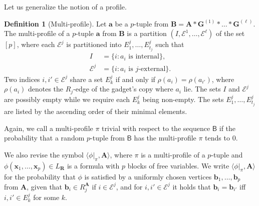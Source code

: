 \documentclass[11pt]{article}
\theoremstyle{plain}
\theoremstyle{definition}
\newtheorem{definition}{Definition}
\theoremstyle{remark}
\newcommand{\stonepar}[2]{\langle #1, #2 \rangle}
\newcommand{\str}[1]{\mathbf{#1}}
\newcommand{\strseq}[1]{{\boldsymbol{\mathsf{#1}}}}
\newcommand{\tpl}[1]{{\bm{#1}}}
\begin{document}
Let us generalize the notion of a profile.

\begin{definition}[Multi-profile]
    Let $\tpl{a}$ be a $p$-tuple from $\str{B} = \str{A}*\str{G}^{(1)}* \dots * \str{G}^{(\ell)}$.
    The multi-profile of a $p$-tuple $\tpl{a}$ from $\str{B}$ is a partition $(I, \mathcal{E}^1, \dots, \mathcal{E}^\ell)$ of the set $[p]$, where each $\mathcal{E}^j$ is partitioned into $E^j_1, \dots, E^j_{t_j}$ such that
    \begin{align*}
        I             &= \{i : a_i\text{ is internal}\}
        , \\
        \mathcal{E}^j &= \{i : a_i\text{ is $j$-external}\}
        .
    \end{align*}
    Two indices $i,i' \in \mathcal{E}^j$ share a set $E^j_k$ if and only if $\rho(a_i) = \rho(a_{i'})$, where $\rho(a_i)$ denotes the $R_j$-edge of the gadget's copy where $a_i$ lie.
    The sets $I$ and $\mathcal{E}^j$ are possibly empty while we require each $E^j_k$ being non-empty.
    The sets $E^j_1, \dots, E^j_{t_j}$ are listed by the ascending order of their minimal elements.
\end{definition}

Again, we call a multi-profile $\pi$ trivial with respect to the sequence $\strseq{B}$ if the probability that a random $p$-tuple from $\strseq{B}$ has the multi-profile $\pi$ tends to $0$.

We also revise the symbol $\stonepar{\phi|_\pi}{\str{A}}$, where $\pi$ is a multi-profile of a $p$-tuple and $\phi(\tpl{x}_1, \dots, \tpl{x}_p) \in L_\tpl{R}$ is a formula with $p$ blocks of free variables.
We write $\stonepar{\phi|_\pi}{\str{A}}$ for the probability that $\phi$ is satisfied by a uniformly chosen vertices $\tpl{b}_1, \dots, \tpl{b}_p$ from $\str{A}$, given that $\tpl{b}_i \in R_j^\str{A}$ if $i \in \mathcal{E}^j$, and for $i, i' \in \mathcal{E}^j$ it holds that $\tpl{b}_i = \tpl{b}_{i'}$ iff $i, i' \in E^j_k$ for some $k$.
\end{document}
